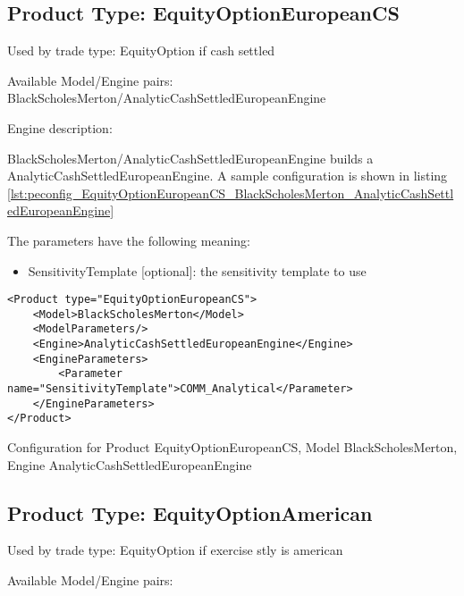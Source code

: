 \subsection{Product Type: EquityOptionEuropeanCS}

Used by trade type: EquityOption if cash settled

Available Model/Engine pairs: BlackScholesMerton/AnalyticCashSettledEuropeanEngine

Engine description:

BlackScholesMerton/AnalyticCashSettledEuropeanEngine builds a AnalyticCashSettledEuropeanEngine. A sample configuration is shown in listing
\ref{lst:peconfig_EquityOptionEuropeanCS_BlackScholesMerton_AnalyticCashSettledEuropeanEngine}

The parameters have the following meaning:

\begin{itemize}
\item SensitivityTemplate [optional]: the sensitivity template to use 
\end{itemize}

\begin{longlisting}
\begin{verbatim}
<Product type="EquityOptionEuropeanCS">
    <Model>BlackScholesMerton</Model>
    <ModelParameters/>
    <Engine>AnalyticCashSettledEuropeanEngine</Engine>
    <EngineParameters>
        <Parameter name="SensitivityTemplate">COMM_Analytical</Parameter>
    </EngineParameters>
</Product>
\end{verbatim}
\caption{Configuration for Product EquityOptionEuropeanCS, Model BlackScholesMerton, Engine AnalyticCashSettledEuropeanEngine}
\label{lst:peconfig_EquityOptionEuropeanCS_BlackScholesMerton_AnalyticCashSettledEuropeanEngine}
\end{longlisting}

\subsection{Product Type: EquityOptionAmerican}

Used by trade type: EquityOption if exercise stly is american

Available Model/Engine pairs:

